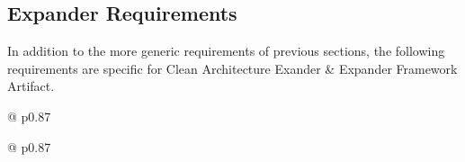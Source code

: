 \subsection{Expander Requirements}

In addition to the more generic requirements of previous sections, the following
requirements are specific for Clean Architecture Exander \& Expander Framework Artifact.

\begin{table}[H]
    \begin{tabular}{@{\makebox[2em][c]{\rownumber\space}}  p{0.87\linewidth}}
        \\ 
    \hline

    \hline
    \end{tabular}
\caption{Expander Framework Requirements}
\label{table_requirements_expanderframework}
\end{table}

\begin{table}[H]
    \begin{tabular}{@{\makebox[2em][c]{\rownumber\space}}  p{0.87\linewidth}}
        \\ 
    \hline

    \hline
    \end{tabular}
\caption{Clean Architecture Expander Requirements}
\label{table_requirements_expander}
\end{table}

